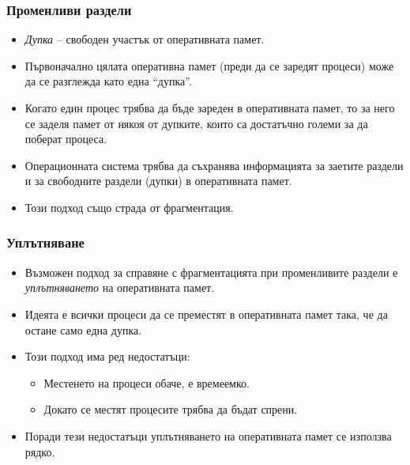 \documentclass[ignorenonframetext, hyperref=unicode]{beamer}
\begin{document}
\begin{frame}
\frametitle{Променливи раздели}
\begin{itemize}
  \item {\em Дупка} -- свободен участък от оперативната памет. 
  \item Първоначално цялата оперативна памет (преди да се заредят процеси)
  може да се разглежда като една ``дупка''.
  \item Когато един процес трябва да бъде зареден в оперативната памет, то за
  него се заделя памет от някоя от дупките, които са достатъчно големи за да
  поберат процеса.
  \item Операционната система трябва да съхранява информацията за заетите
  раздели и за свободните раздели (дупки) в оперативната памет.
  \item Този подход също страда от фрагментация. 
\end{itemize}
\end{frame}


\begin{frame}
\frametitle{Уплътняване}
\begin{itemize}
  \item Възможен подход за справяне с фрагментацията при променливите раздели е
  {\em уплътняването} на оперативната памет.
  \item Идеята е всички процеси да се преместят в оперативната памет така, че
  да остане само една дупка.
  \item Този подход има ред недостатъци:
  \begin{itemize}
    \item Местенето на процеси обаче, е времеемко. 
    \item Докато се местят процесите
  трябва да бъдат спрени.
  \end{itemize}
  \item Поради тези недостатъци уплътняването на оперативната памет се използва
  рядко.
\end{itemize}
\end{frame}
\end{document}
